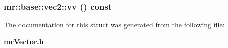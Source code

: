 \subsubsection{ mr::base::vec2::vv () const\hspace{0.3cm}{\tt  [inline]}}\label{structmr_1_1base_1_1vec2_a11}




The documentation for this struct was generated from the following file:\begin{CompactItemize}
\item 
{\bf mr\-Vector.h}\end{CompactItemize}
